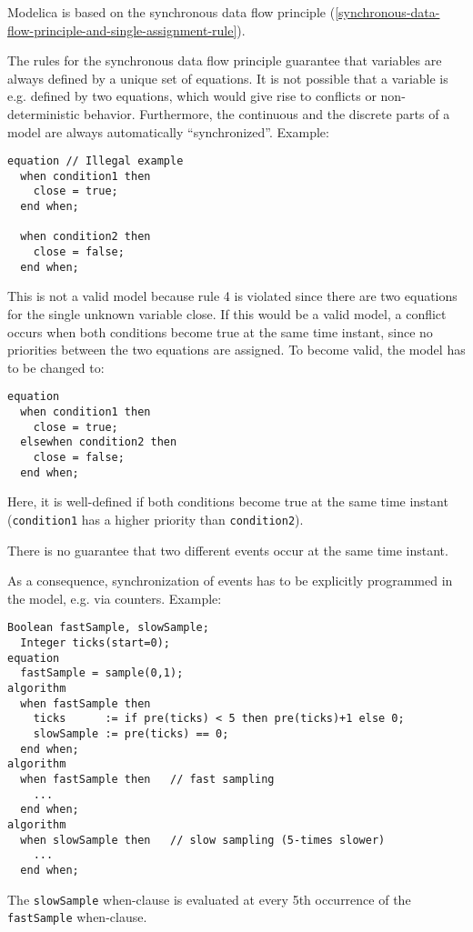 Modelica is based on the synchronous data flow principle (\autoref{synchronous-data-flow-principle-and-single-assignment-rule}).

\begin{nonnormative}
The rules for the synchronous data flow principle guarantee
that variables are always defined by a unique set of equations. It is
not possible that a variable is e.g. defined by two equations, which
would give rise to conflicts or non-deterministic behavior. Furthermore,
the continuous and the discrete parts of a model are always
automatically ``synchronized''. Example:
\begin{lstlisting}[language=modelica]
equation // Illegal example
  when condition1 then
    close = true;
  end when;

  when condition2 then
    close = false;
  end when;
\end{lstlisting}

This is not a valid model because rule 4 is violated since there
are two equations for the single unknown variable close. If this would
be a valid model, a conflict occurs when both conditions become true at
the same time instant, since no priorities between the two equations are
assigned. To become valid, the model has to be changed to:
\begin{lstlisting}[language=modelica]
equation
  when condition1 then
    close = true;
  elsewhen condition2 then
    close = false;
  end when;
\end{lstlisting}

Here, it is well-defined if both conditions become true at the
same time instant (\lstinline!condition1! has a higher priority than
\lstinline!condition2!).
\end{nonnormative}

There is no guarantee that two different events occur at the same time
instant.

\begin{nonnormative}
As a consequence, synchronization of events has to be
explicitly programmed in the model, e.g. via counters. Example:
\begin{lstlisting}[language=modelica]
  Boolean fastSample, slowSample;
  Integer ticks(start=0);
equation
  fastSample = sample(0,1);
algorithm
  when fastSample then
    ticks      := if pre(ticks) < 5 then pre(ticks)+1 else 0;
    slowSample := pre(ticks) == 0;
  end when;
algorithm
  when fastSample then   // fast sampling
    ...
  end when;
algorithm
  when slowSample then   // slow sampling (5-times slower)
    ...
  end when;
\end{lstlisting}

The \lstinline!slowSample! when-clause is evaluated at every 5th occurrence of the
\lstinline!fastSample! when-clause.
\end{nonnormative}

